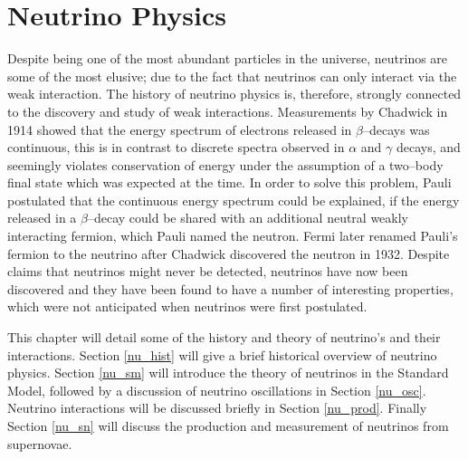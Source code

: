 \chapter{\label{ch:neutrinophysics}Neutrino Physics} 



 

\minitoc

Despite being one of the most abundant particles in the universe, neutrinos are 
some of the most elusive; due to the fact that neutrinos can only interact via
the weak interaction. The history of neutrino physics is, therefore, strongly
connected to the discovery and study of weak interactions. Measurements by
Chadwick in 1914 showed that the energy spectrum of electrons released in
$\beta$--decays was continuous, this is in contrast to discrete spectra
observed in $\alpha$ and $\gamma$ decays, and seemingly violates
conservation of energy under the assumption of a two--body final state which was
expected at the time. In order to solve this problem, Pauli postulated that the 
continuous energy spectrum could be explained, if the energy released in a 
$\beta$--decay could be shared with an additional neutral weakly interacting 
fermion, which Pauli named the neutron. Fermi later renamed Pauli's fermion to 
the neutrino after Chadwick discovered the neutron in 1932. Despite claims that 
neutrinos might never be detected, neutrinos have now been discovered and they 
have been found to have a number of interesting properties, which were not 
anticipated when neutrinos were first postulated. 

This chapter will detail some of the history and theory of neutrino's and their 
interactions. Section \ref{nu_hist} will give a brief historical overview of 
neutrino physics. Section \ref{nu_sm} will introduce the theory of neutrinos 
in the Standard Model, followed by a discussion of neutrino oscillations in 
Section \ref{nu_osc}. Neutrino interactions will be discussed briefly in 
Section \ref{nu_prod}. Finally Section \ref{nu_sn} will discuss the production 
and measurement of neutrinos from supernovae.

